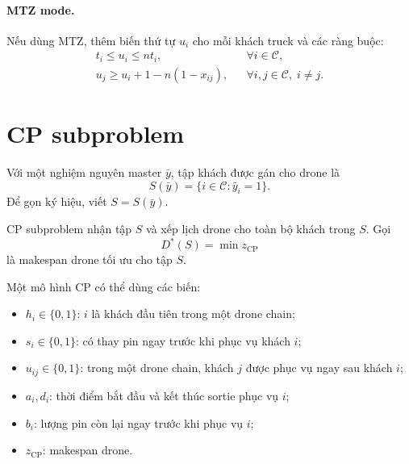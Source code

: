 \documentclass[12pt,a4paper]{article}
\newcommand{\C}{\mathcal{C}}
\begin{document}
\paragraph{MTZ mode.}
Nếu dùng MTZ, thêm biến thứ tự $u_i$ cho mỗi khách truck và các ràng buộc:
\begin{align}
    t_i\le u_i\le nt_i, && \forall i\in \C, \label{eq:mtz-domain}\\
    u_j\ge u_i+1-n(1-x_{ij}), && \forall i,j\in \C,\;i\neq j. \label{eq:mtz-cut}
\end{align}

\section{CP subproblem}
\label{sec:cp}

Với một nghiệm nguyên master $\bar y$, tập khách được gán cho drone là
\begin{equation}
    S(\bar y)=\{i\in \C:\bar y_i=1\}.
    \label{eq:drone-set}
\end{equation}
Để gọn ký hiệu, viết $S=S(\bar y)$.

CP subproblem nhận tập $S$ và xếp lịch drone cho toàn bộ khách trong $S$. Gọi
\[
    D^*(S)=\min z_{\mathrm{CP}}
\]
là makespan drone tối ưu cho tập $S$.

Một mô hình CP có thể dùng các biến:
\begin{itemize}[leftmargin=2em]
    \item $h_i\in\{0,1\}$: $i$ là khách đầu tiên trong một drone chain;
    \item $s_i\in\{0,1\}$: có thay pin ngay trước khi phục vụ khách $i$;
    \item $u_{ij}\in\{0,1\}$: trong một drone chain, khách $j$ được phục vụ ngay sau khách $i$;
    \item $a_i,d_i$: thời điểm bắt đầu và kết thúc sortie phục vụ $i$;
    \item $b_i$: lượng pin còn lại ngay trước khi phục vụ $i$;
    \item $z_{\mathrm{CP}}$: makespan drone.
\end{itemize}
\end{document}
